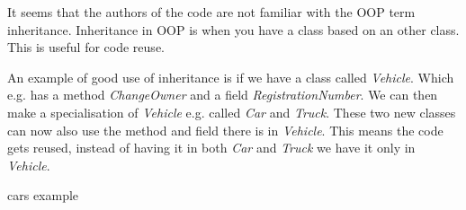 It seems that the authors of the code are not familiar with the OOP term inheritance.
Inheritance in OOP is when you have a class based on an other class.
This is useful for code reuse.

An example of good use of inheritance is if we have a class called \textit{Vehicle}.
Which e.g. has a method \textit{ChangeOwner} and a field \textit{RegistrationNumber}.
We can then make a specialisation of \textit{Vehicle} e.g. called \textit{Car} and \textit{Truck}.
These two new classes can now also use the method and field there is in \textit{Vehicle}.
This means the code gets reused, instead of having it in both \textit{Car} and \textit{Truck} we have it only in \textit{Vehicle}.

cars example